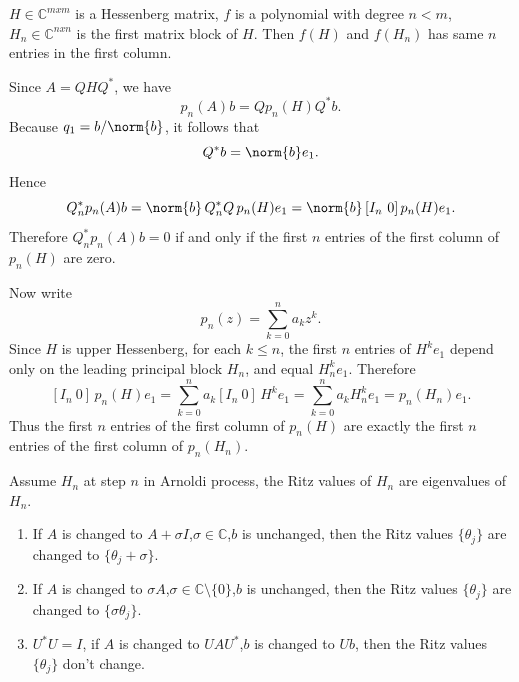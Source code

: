 \documentclass{ctexart}
\begin{document}
\begin{problem}\label{pro:3}
  \(H \in \mathbb{C}^{m xm}  \) is a Hessenberg matrix, \(f \) is a polynomial with degree \(n<m \), \(H_n \in \mathbb{C}^{n x n}\) is the first matrix block of \(H \).
  Then \(f(H) \) and \(f(H_n) \) has same \(n \) entries in the first column.
\end{problem}
\begin{solution}
  Since \(A=QHQ^*\), we have
  \[
    p_n(A)b = Qp_n(H)Q^*b.
  \]
  Because \(q_1=b/\norm{b}\), it follows that
  \[
    Q^*b=\norm{b}e_1.
  \]
  Hence
  \[
    Q_n^*p_n(A)b
    = \norm{b}\,Q_n^*Q\,p_n(H)e_1
    = \norm{b}\,[I_n\ 0]\,p_n(H)e_1.
  \]
  Therefore \(Q_n^*p_n(A)b=0\) if and only if the first \(n\) entries of the first column of \(p_n(H)\) are zero.

  Now write
  \[
    p_n(z)=\sum_{k=0}^n a_k z^k.
  \]
  Since \(H\) is upper Hessenberg, for each \(k\le n\), the first \(n\) entries of \(H^k e_1\) depend only on the leading principal block \(H_n\), and equal \(H_n^k e_1\). Therefore
  \[
    [I_n\ 0]\,p_n(H)e_1
    =
    \sum_{k=0}^n a_k [I_n\ 0]\,H^k e_1
    =
    \sum_{k=0}^n a_k H_n^k e_1
    =
    p_n(H_n)e_1.
  \]
  Thus the first \(n\) entries of the first column of \(p_n(H)\) are exactly the first \(n\) entries of the first column of \(p_n(H_n)\).
\end{solution}
\begin{problem}\label{pro:4}
  Assume \(H_n \) at step \(n \) in Arnoldi process, the Ritz values of \(H_n \) are eigenvalues of \(H_n \).
  \begin{enumerate}
    \item If \(A \) is changed to \(A + \sigma I \),\(\sigma \in \mathbb{C} \),\(b \) is unchanged, then the Ritz values \(\{\theta_j\} \) are changed to \(\{\theta_j + \sigma\} \).
    \item If \(A \) is changed to \(\sigma A \),\(\sigma \in \mathbb{C}\setminus\{0\} \),\(b \) is unchanged, then the Ritz values \(\{\theta_j\} \) are changed to \(\{\sigma \theta_j\} \).
    \item \(U^* U =I \), if \(A \) is changed to \(U A U^*\),\(b \) is changed to \(Ub \), then the Ritz values \(\{\theta_j\} \) don't change.
  \end{enumerate}
\end{problem}
\end{document}
